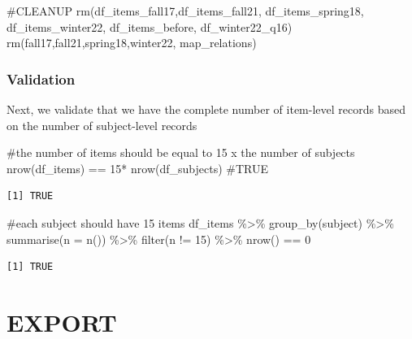 \documentclass[
  letterpaper,
  DIV=11,
  numbers=noendperiod]{scrreprt}
\newenvironment{Shaded}{\begin{snugshade}}{\end{snugshade}}
\newcommand{\AttributeTok}[1]{\textcolor[rgb]{0.40,0.45,0.13}{#1}}
\newcommand{\CommentTok}[1]{\textcolor[rgb]{0.37,0.37,0.37}{#1}}
\newcommand{\DecValTok}[1]{\textcolor[rgb]{0.68,0.00,0.00}{#1}}
\newcommand{\FunctionTok}[1]{\textcolor[rgb]{0.28,0.35,0.67}{#1}}
\newcommand{\NormalTok}[1]{\textcolor[rgb]{0.00,0.23,0.31}{#1}}
\newcommand{\SpecialCharTok}[1]{\textcolor[rgb]{0.37,0.37,0.37}{#1}}
\begin{document}
\begin{Shaded}
\begin{Highlighting}[]
\CommentTok{\#CLEANUP}
\FunctionTok{rm}\NormalTok{(df\_items\_fall17,df\_items\_fall21, df\_items\_spring18, df\_items\_winter22, df\_items\_before, df\_winter22\_q16)}
\FunctionTok{rm}\NormalTok{(fall17,fall21,spring18,winter22, map\_relations)}
\end{Highlighting}
\end{Shaded}

\hypertarget{validation}{%
\subsection{Validation}\label{validation}}

Next, we validate that we have the complete number of item-level records
based on the number of subject-level records

\begin{Shaded}
\begin{Highlighting}[]
\CommentTok{\#the number of items should be equal to 15 x the number of subjects}
\FunctionTok{nrow}\NormalTok{(df\_items) }\SpecialCharTok{==} \DecValTok{15}\SpecialCharTok{*} \FunctionTok{nrow}\NormalTok{(df\_subjects) }\CommentTok{\#TRUE}
\end{Highlighting}
\end{Shaded}

\begin{verbatim}
[1] TRUE
\end{verbatim}

\begin{Shaded}
\begin{Highlighting}[]
\CommentTok{\#each subject should have 15 items}
\NormalTok{df\_items }\SpecialCharTok{\%\textgreater{}\%} \FunctionTok{group\_by}\NormalTok{(subject) }\SpecialCharTok{\%\textgreater{}\%} \FunctionTok{summarise}\NormalTok{(}\AttributeTok{n =} \FunctionTok{n}\NormalTok{()) }\SpecialCharTok{\%\textgreater{}\%} \FunctionTok{filter}\NormalTok{(n }\SpecialCharTok{!=} \DecValTok{15}\NormalTok{) }\SpecialCharTok{\%\textgreater{}\%} \FunctionTok{nrow}\NormalTok{() }\SpecialCharTok{==} \DecValTok{0}
\end{Highlighting}
\end{Shaded}

\begin{verbatim}
[1] TRUE
\end{verbatim}

\hypertarget{export}{%
\chapter{EXPORT}\label{export}}
\end{document}
